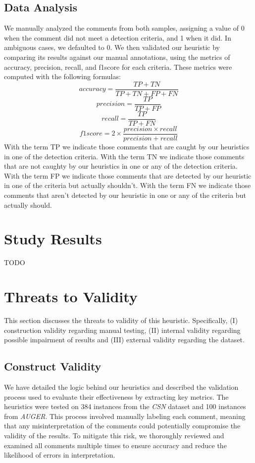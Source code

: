 \subsection{Data Analysis}
We manually analyzed the comments from both samples, assigning a value of 0 when the comment did not meet a detection criteria, and 1 when it did. In ambiguous cases, we defaulted to 0.
We then validated our heuristic by comparing its results against our manual annotations, using the metrics of accuracy, precision, recall, and f1score for each criteria. These metrics were computed with the following formulas:
\begin{equation*}
	accuracy = \frac{TP + TN}{TP + TN + FP + FN}		
\end{equation*}
\begin{equation*}
	precision = \frac{TP}{TP + FP}
\end{equation*}
\begin{equation*}
	recall = \frac{TP}{TP + FN}
\end{equation*}
\begin{equation*}
	f1score = 2 \times \frac{precision \times recall}{precision + recall}
\end{equation*}
With the term TP we indicate those comments that are caught by our heuristics in one of the detection criteria. With the term TN we indicate those comments that are not caughty by our heuristics in one or any of the detection criteria. With the term FP we indicate those comments that are detected by our heuristic in one of the criteria but actually shouldn't. With the term FN we indicate those comments that aren't detected by our heuristic in one or any of the criteria but actually should.

\section{Study Results}
TODO

\section{Threats to Validity}
This section discusses the threats to validity of this heuristic. Specifically, (I) construction validity regarding manual testing, (II) internal validity regarding possible impairment of results and (III) external validity regarding the dataset.

\subsection{Construct Validity}
We have detailed the logic behind our heuristics and described the validation process used to evaluate their effectiveness by extracting key metrics. The heuristics were tested on 384 instances from the \textit{CSN} dataset and 100 instances from \textit{AUGER}. This process involved manually labeling each comment, meaning that any misinterpretation of the comments could potentially compromise the validity of the results. To mitigate this risk, we thoroughly reviewed and examined all comments multiple times to ensure accuracy and reduce the likelihood of errors in interpretation.

